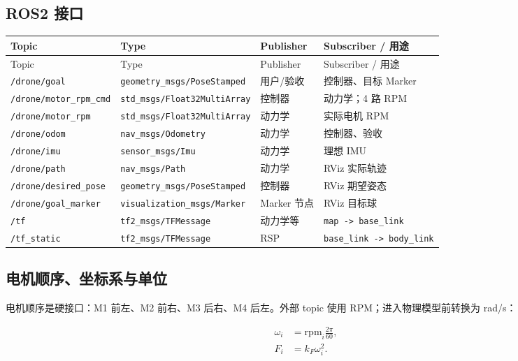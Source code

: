 \documentclass[UTF8,a4paper,12pt,fontset=fandol]{ctexart}
\newcommand{\tcode}[1]{\nolinkurl{#1}}
\begin{document}
\subsection{ROS2 接口}

{\footnotesize
\setlength{\tabcolsep}{3pt}
\begin{longtable}{P{0.21\textwidth}P{0.26\textwidth}P{0.16\textwidth}P{0.22\textwidth}}
\toprule
Topic & Type & Publisher & Subscriber / 用途 \\
\midrule
\endfirsthead
\toprule
Topic & Type & Publisher & Subscriber / 用途 \\
\midrule
\endhead
\tcode{/drone/goal} & \tcode{geometry_msgs/PoseStamped} & 用户/验收 & 控制器、目标 Marker \\
\tcode{/drone/motor_rpm_cmd} & \tcode{std_msgs/Float32MultiArray} & 控制器 & 动力学；4 路 RPM \\
\tcode{/drone/motor_rpm} & \tcode{std_msgs/Float32MultiArray} & 动力学 & 实际电机 RPM \\
\tcode{/drone/odom} & \tcode{nav_msgs/Odometry} & 动力学 & 控制器、验收 \\
\tcode{/drone/imu} & \tcode{sensor_msgs/Imu} & 动力学 & 理想 IMU \\
\tcode{/drone/path} & \tcode{nav_msgs/Path} & 动力学 & RViz 实际轨迹 \\
\tcode{/drone/desired_pose} & \tcode{geometry_msgs/PoseStamped} & 控制器 & RViz 期望姿态 \\
\tcode{/drone/goal_marker} & \tcode{visualization_msgs/Marker} & Marker 节点 & RViz 目标球 \\
\tcode{/tf} & \tcode{tf2_msgs/TFMessage} & 动力学等 & \tcode{map -> base_link} \\
\tcode{/tf_static} & \tcode{tf2_msgs/TFMessage} & RSP & \tcode{base_link -> body_link} \\
\bottomrule
\end{longtable}
}

\subsection{电机顺序、坐标系与单位}

电机顺序是硬接口：M1 前左、M2 前右、M3 后右、M4 后左。外部 topic 使用 RPM；进入物理模型前转换为 rad/s：

\begin{align}
\omega_i &= \mathrm{rpm}_i \frac{2\pi}{60},\\
F_i &= k_F \omega_i^2.
\end{align}
\end{document}
